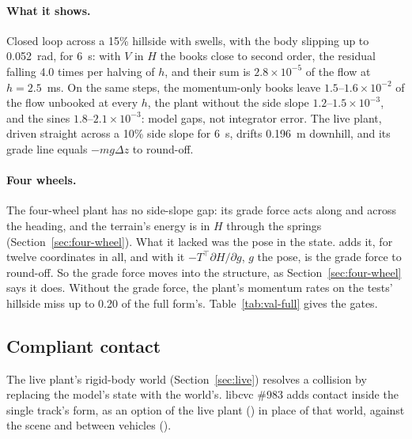 \documentclass[11pt]{article}
\theoremstyle{remark}
\newcommand{\T}{^{\top}}
\begin{document}
\paragraph{What it shows.} Closed loop across a 15\% hillside with swells, with the body slipping
up to 0.052~rad, for 6~s: with $V$ in $H$ the books close to second order, the residual falling 4.0
times per halving of $h$, and their sum is $2.8\times10^{-5}$ of the flow at $h=2.5$~ms. On the same
steps, the momentum-only books leave $1.5$--$1.6\times10^{-2}$ of the flow unbooked at every $h$,
the plant without the side slope $1.2$--$1.5\times10^{-3}$, and the sines $1.8$--$2.1\times10^{-3}$:
model gaps, not integrator error. The live plant, driven straight across a 10\% side slope for
6~s, drifts 0.196~m downhill, and its grade line equals $-mg\Delta z$ to round-off.

\paragraph{Four wheels.} The four-wheel plant has no side-slope gap: its grade force acts along and
across the heading, and the terrain's energy is in $H$ through the springs
(Section~\ref{sec:four-wheel}). What it lacked was the pose in the state.
 adds it, for twelve coordinates in all, and with it
$-T\T\partial H/\partial g$, $g$ the pose, is the grade force to round-off. So the grade force moves
into the structure, as Section~\ref{sec:four-wheel} says it does. Without the grade force, the
plant's momentum rates on the tests' hillside miss up to 0.20 of the full form's.
Table~\ref{tab:val-full} gives the gates.

\subsection{Compliant contact}
\label{sec:contact}
The live plant's rigid-body world (Section~\ref{sec:live}) resolves a collision by replacing the
model's state with the world's. libcvc \#983 adds contact inside the single track's form, as an
option of the live plant () in place of that world,
against the scene and between vehicles ().
\end{document}
